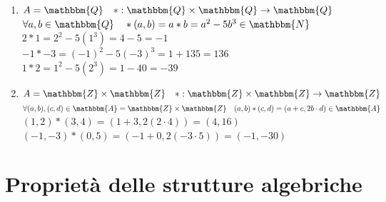 \documentclass[12pt, letterpaper]{report}
\begin{document}
\begin{enumerate}
			$(\mathbbm{Q} \backslash \{0\}, \cdot)$  è una struttura algebrica. \\
			$(\mathbbm{R} \backslash \{0\}, -)$ è struttura algebriche
			\item $A = \mathbbm{Q} \quad *:\mathbbm{Q} \times \mathbbm{Q} \to \mathbbm{Q}$ \\
			$\forall a,b \in \mathbbm{Q} \quad *(a, b) = a*b = a^2-5b^3 \in \mathbbm{N}$ \\
			$2*1 = 2^2 - 5(1^3) = 4 - 5 = -1$ \\
			$-1*-3 = (-1)^2 - 5(-3)^3 = 1 + 135 = 136$ \\
			$1*2 = 1^2 - 5(2^3) = 1-40 = -39$
			\item $A = \mathbbm{Z} \times \mathbbm{Z}  \quad *:\mathbbm{Z} \times \mathbbm{Z} \to \mathbbm{Z}$ \\
			$\forall (a,b), (c,d) \in \mathbbm{A} = \mathbbm{Z} \times \mathbbm{Z} \quad (a, b)*(c,d) = (a+c, 2b\cdot d) \in \mathbbm{A}$ \\
			$(1,2)*(3,4) = (1 + 3, 2(2 \cdot 4)) = (4, 16)$ \\
			$(-1, -3) * (0, 5) = (-1 + 0, 2( -3 \cdot 5)) = (-1, -30)$
		\end{enumerate}
		\section{Proprietà delle strutture algebriche}
\end{document}
